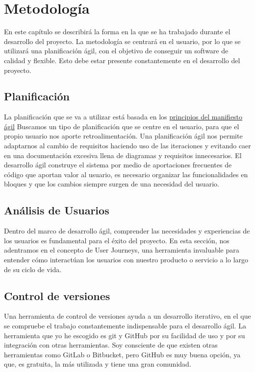 \UseRawInputEncoding
\chapter{Metodología}
En este capítulo se describirá la forma en la que se ha trabajado durante el desarrollo del proyecto.
La metodología se centrará en el usuario, por lo que se utilizará una planificación ágil, con el objetivo
de conseguir un software de calidad y flexible. Esto debe estar presente constantemente en el desarrollo del proyecto.

\section{Planificación}
La planificación que se va a utilizar está basada en los {\href{https://agilemanifesto.org/iso/es/principles.html}{principios del manifiesto ágil}}
Buscamos un tipo de planificación que se centre en el usuario, para que el propio usuario nos aporte retroalimentación.
Una planificación ágil nos permite adaptarnos al cambio de requisitos haciendo uso de las iteraciones y
evitando caer en una documentación excesiva llena de diagramas y requisitos innecesarios.
El desarrollo ágil construye el sistema por medio de aportaciones frecuentes de código que aportan valor
al usuario, es necesario organizar las funcionalidades en bloques y que los cambios siempre surgen de una
necesidad del usuario.

\section{Análisis de Usuarios}
Dentro del marco de desarrollo ágil, comprender las necesidades y experiencias de los usuarios es fundamental para el éxito del proyecto.
En esta sección, nos adentramos en el concepto de User Journeys, una herramienta invaluable para entender cómo interactúan los usuarios con nuestro producto o servicio a lo largo de su ciclo de vida.



\section{Control de versiones}
Una herramienta de control de versiones ayuda a un desarrollo iterativo, en el que se compruebe el trabajo constantemente indispensable para el desarrollo ágil.
La herramienta que yo he escogido es git y GitHub por su facilidad de uso y por su integración con otras herramientas.
Soy consciente de que existen otras herramientas como GitLab o Bitbucket, pero GitHub es muy buena opción, ya que, es gratuita, la más utilizada y tiene una gran comunidad.

